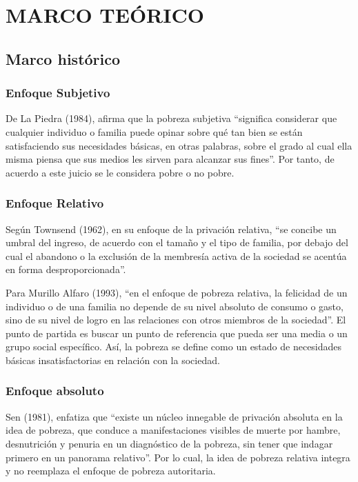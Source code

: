\section{\large MARCO TEÓRICO}

\subsection{Marco histórico}
	
\subsubsection{Enfoque Subjetivo}

De La Piedra (1984), afirma que la pobreza subjetiva “significa considerar que cualquier individuo o familia puede opinar sobre qué tan bien se están satisfaciendo sus necesidades básicas, en otras palabras, sobre el grado al cual ella misma piensa que sus medios les sirven para alcanzar sus fines”. Por tanto, de acuerdo a este juicio se le considera pobre o no pobre.

\subsubsection{Enfoque Relativo}
Según Townsend (1962), en su enfoque de la privación relativa, “se concibe un umbral del ingreso, de acuerdo con el tamaño y el tipo de familia, por debajo del cual el abandono o la exclusión de la membresía activa de la sociedad se acentúa en forma desproporcionada”. 

Para Murillo Alfaro (1993), “en el enfoque de pobreza relativa, la felicidad de un individuo o de una familia no depende de su nivel absoluto de consumo o gasto, sino de su nivel de logro en las relaciones con otros miembros de la sociedad”. El punto de partida es buscar un punto de referencia que pueda ser una media o un grupo social específico. Así, la pobreza se define como un estado de necesidades básicas insatisfactorias en relación con la sociedad.

\subsubsection{Enfoque absoluto}
Sen (1981), enfatiza que “existe un núcleo innegable de privación absoluta en la idea de pobreza, que conduce a manifestaciones visibles de muerte por hambre, desnutrición y penuria en un diagnóstico de la pobreza, sin tener que indagar primero en un panorama relativo”. Por lo cual, la idea de pobreza relativa integra y no reemplaza el enfoque de pobreza autoritaria.



